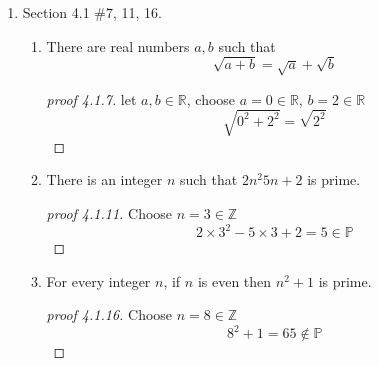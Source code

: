 \documentclass[12pt]{article}
\newcommand{\Z}{\mathbb{Z}}
\newcommand{\R}{\mathbb{R}}
\begin{document}
\begin{enumerate}
        \item Section 4.1 \#7, 11, 16.
            \begin{enumerate}
                \item[7.] There are real numbers $a,b$ such that 
                    \[
                    \sqrt{a+b} = \sqrt{a} + \sqrt{b}
                    \]
                \begin{proof}[proof 4.1.7]
                    let $a,b \in \R$, choose $a=0 \in \R$, $b=2 \in \R$\\
                    \[
                    \sqrt{0^2 + 2^2} = \sqrt{2^2}
                    \]
                    
                \end{proof}

                \item[11.] There is an integer $n$ such that $2n^2 5n +2$ is prime.
                    \begin{proof}[proof 4.1.11]
                        Choose $n=3 \in \Z$
                        \[
                        2\times 3^2 -5 \times 3 +2 = 5 \in \mathbb{P}
                        \]
                    \end{proof}

                \item[16.] For every integer $n$, if $n$ is even then $n^2+1$ is prime.
                    \begin{proof}[proof 4.1.16]
                        Choose $n = 8 \in \Z$
                        \[
                        8^2 + 1 = 65 \notin \mathbb{P}
                        \]
                    \end{proof}
            \end{enumerate}

        \newpage
        

\end{enumerate}
\end{document}
